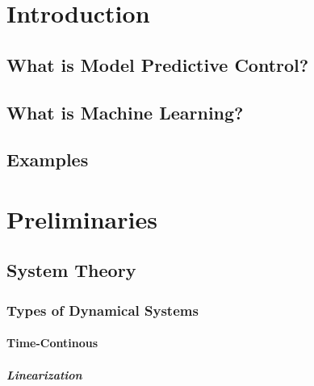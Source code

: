 \chapter{Introduction} %

    \section{What is Model Predictive Control?} %

    \section{What is Machine Learning?} %

    \section{Examples} %

\chapter{Preliminaries} %

    \section{System Theory} %

        \subsection{Types of Dynamical Systems} %

            \subsubsection{Time-Continous} %

                \paragraph{Linearization} %

